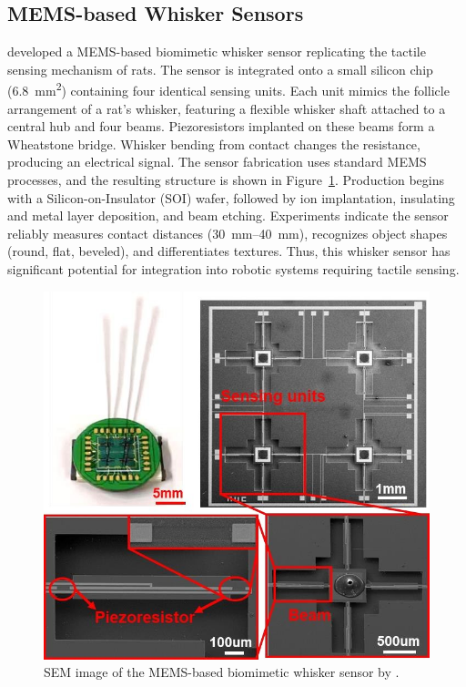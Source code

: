 \subsection{MEMS-based Whisker Sensors}
\textcite{9114501} developed a MEMS-based biomimetic whisker sensor replicating the tactile sensing mechanism of rats.
The sensor is integrated onto a small silicon chip (\SI{6.8}{\milli\meter\squared}) containing four identical sensing units.
Each unit mimics the follicle arrangement of a rat's whisker, featuring a flexible whisker shaft attached to a central hub and four beams.
Piezoresistors implanted on these beams form a Wheatstone bridge.
Whisker bending from contact changes the resistance, producing an electrical signal.
The sensor fabrication uses standard MEMS processes, and the resulting structure is shown in Figure~\ref{fig:mems-whisker}.
Production begins with a Silicon-on-Insulator (SOI) wafer, followed by ion implantation, insulating and metal layer deposition, and beam etching.
Experiments indicate the sensor reliably measures contact distances (\qtyrange{30}{40}{\milli\metre}), recognizes object shapes (round, flat, beveled), and differentiates textures.
Thus, this whisker sensor has significant potential for integration into robotic systems requiring tactile sensing.

\begin{figure}[htb]
    \centering
    \includegraphics[height=0.4\textheight]{figures/mems-whisker}
    \caption{SEM image of the MEMS-based biomimetic whisker sensor by \textcite{9114501}.}
    \label{fig:mems-whisker}
\end{figure}

